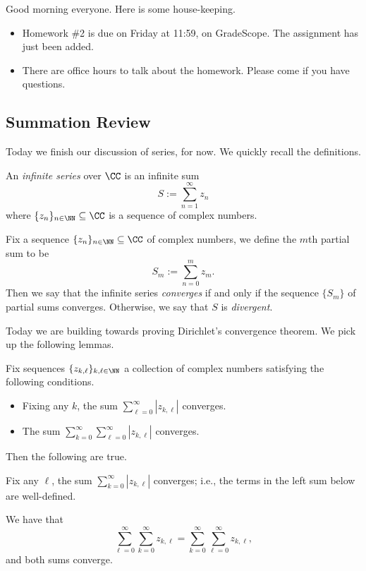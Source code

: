 
Good morning everyone. Here is some house-keeping.
\begin{itemize}
	\item Homework \#2 is due on Friday at 11:59, on GradeScope. The assignment has just been added.
	\item There are office hours to talk about the homework. Please come if you have questions.
\end{itemize}

\subsection{Summation Review}
Today we finish our discussion of series, for now. We quickly recall the definitions.
\begin{definition}[Series]
	An \textit{infinite series} over $\CC$ is an infinite sum
	\[S:=\sum_{n=1}^\infty z_n\]
	where $\{z_n\}_{n\in\NN}\subseteq\CC$ is a sequence of complex numbers.
\end{definition}
\begin{definition}
	Fix a sequence $\{z_n\}_{n\in\NN}\subseteq\CC$ of complex numbers, we define the $m$th partial sum to be
	\[S_m:=\sum_{n=0}^mz_m.\]
	Then we say that the infinite series \textit{converges} if and only if the sequence $\{S_m\}$ of partial sums converges. Otherwise, we say that $S$ is \textit{divergent}.
\end{definition}
Today we are building towards proving Dirichlet's convergence theorem. We pick up the following lemmas.
\begin{lemma} \label{lem:doublesums}
	Fix sequences $\{z_{k,\ell}\}_{k,\ell\in\NN}$ a collection of complex numbers satisfying the following conditions.
	\begin{itemize}
		\item Fixing any $k$, the sum $\sum_{\ell=0}^\infty|z_{k,\ell}|$ converges.
		\item The sum $\sum_{k=0}^\infty\sum_{\ell=0}^\infty|z_{k,\ell}|$ converges.
	\end{itemize}
	Then the following are true.
	\begin{listalph}
		\item Fix any $\ell$, the sum $\sum_{k=0}^\infty|z_{k,\ell}|$ converges; i.e., the terms in the left sum below are well-defined.
		\item We have that
		\[\sum_{\ell=0}^\infty\sum_{k=0}^\infty z_{k,\ell}=\sum_{k=0}^\infty\sum_{\ell=0}^\infty z_{k,\ell},\]
		and both sums converge.
	\end{listalph}
\end{lemma}
